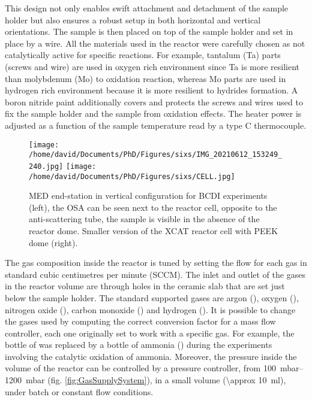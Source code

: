 This design not only enables swift attachment and detachment of the sample holder but also ensures a robust setup in both horizontal and vertical orientations.
The sample is then placed on top of the sample holder and set in place by a wire.
All the materials used in the reactor were carefully chosen as not catalytically active for specific reactions.
For example, tantalum (Ta) parts (screws and wire) are used in oxygen rich environment since Ta is more resilient than molybdenum (Mo) to oxidation reaction, whereas Mo parts are used in hydrogen rich environment because it is more resilient to hydrides formation.
A boron nitride paint additionally covers and protects the screws and wires used to fix the sample holder and the sample from oxidation effects.
The heater power is adjusted as a function of the sample temperature read by a type C thermocouple.

\begin{figure}[!htb]
    \centering
    \texttt{[image: /home/david/Documents/PhD/Figures/sixs/IMG\_20210612\_153249\_240.jpg]}
    \texttt{[image: /home/david/Documents/PhD/Figures/sixs/CELL.jpg]}
    \caption{
        MED end-station in vertical configuration for BCDI experiments (left), the OSA can be seen next to the reactor cell, opposite to the anti-scattering tube, the sample is visible in the absence of the reactor dome.
        Smaller version of the XCAT reactor cell with PEEK dome (right).
    }
    \label{fig:MEDV}
\end{figure}

The gas composition inside the reactor is tuned by setting the flow for each gas in standard cubic centimetres per minute (SCCM).
The inlet and outlet of the gases in the reactor volume are through holes in the ceramic slab that are set just below the sample holder.
The standard supported gases are argon (\argon), oxygen (\dioxygen), nitrogen oxide (\nitricoxide), carbon monoxide () and hydrogen ().
It is possible to change the gases used by computing the correct conversion factor for a mass flow controller, each one originally set to work with a specific gas.
For example, the bottle of  was replaced by a bottle of ammonia (\ammonia) during the experiments involving the catalytic oxidation of ammonia.
Moreover, the pressure inside the volume of the reactor can be controlled by a pressure controller, from \qtyrange{100}{1200}{\milli\bar} (fig. \ref{fig:GasSupplySystem}), in a small volume (\qty{\approx 10}{\ml}), under batch or constant flow conditions.

